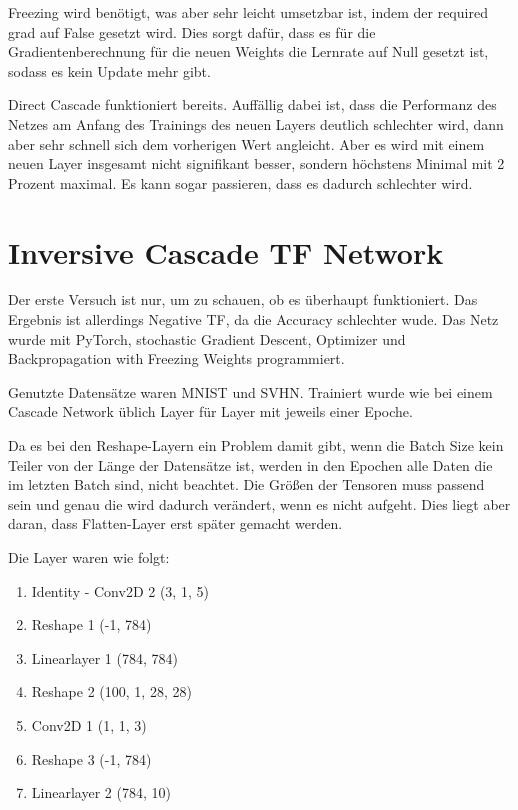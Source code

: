     Freezing wird benötigt, was aber sehr leicht umsetzbar ist, indem 
    der required grad auf False gesetzt wird. Dies sorgt dafür, dass 
    es für die Gradientenberechnung für die neuen Weights die Lernrate 
    auf Null gesetzt ist, sodass es kein Update mehr gibt.

    Direct Cascade funktioniert bereits. Auffällig dabei ist, dass 
    die Performanz des Netzes am Anfang des Trainings des neuen Layers 
    deutlich schlechter wird, dann aber sehr schnell sich dem vorherigen 
    Wert angleicht. Aber es wird mit einem neuen Layer insgesamt nicht 
    signifikant besser, sondern höchstens Minimal mit 2 Prozent maximal. 
    Es kann sogar passieren, dass es dadurch schlechter wird.
    
\section{Inversive Cascade TF Network}

    Der erste Versuch ist nur, um zu schauen, ob es überhaupt funktioniert. 
    Das Ergebnis ist allerdings Negative TF, da die Accuracy schlechter wude. 
    Das Netz wurde mit PyTorch, stochastic Gradient Descent, Optimizer und 
    Backpropagation with Freezing Weights programmiert. 

    Genutzte Datensätze waren MNIST und SVHN. Trainiert wurde wie bei einem 
    Cascade Network üblich Layer für Layer mit jeweils einer Epoche.

    Da es bei den Reshape-Layern ein Problem damit gibt, wenn die Batch Size kein Teiler 
    von der Länge der Datensätze ist, werden in den Epochen alle Daten die im letzten Batch 
    sind, nicht beachtet. Die Größen der Tensoren muss passend sein und genau die wird 
    dadurch verändert, wenn es nicht aufgeht. Dies liegt aber daran, dass Flatten-Layer 
    erst später gemacht werden.

    Die Layer waren wie folgt: 
    \begin{enumerate}
        \item Identity -\> Conv2D 2 (3, 1, 5)
        \item Reshape 1 (-1, 784)
        \item Linearlayer 1 (784, 784)
        \item Reshape 2 (100, 1, 28, 28)
        \item Conv2D 1 (1, 1, 3)
        \item Reshape 3 (-1, 784)
        \item Linearlayer 2 (784, 10)
    \end{enumerate}

